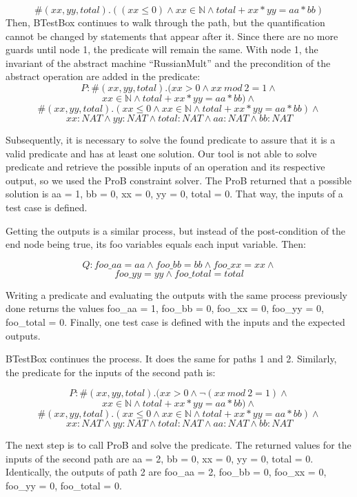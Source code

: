 \documentclass[runningheads]{llncs}
\begin{document}
$$\#(xx, yy, total).((xx \leq 0) \wedge xx \in \mathbb{N} \wedge total + xx * yy = aa * bb)$$
\nolinebreak[4]  Then, BTestBox continues to walk through the path, but the quantification cannot be changed by statements that appear after it. Since there are no more guards until node 1, the predicate will remain the same. With node 1, the invariant of the abstract machine ``RussianMult'' and the precondition of the abstract operation are added in the predicate: \nolinebreak[4]
\noindent
$$P: \#(xx, yy, total).(xx > 0 \wedge xx\ mod\ 2 = 1 \wedge$$
$$ xx \in \mathbb{N} \wedge total + xx * yy = aa * bb) \wedge$$
$$\#(xx, yy, total).(xx \leq 0 \wedge xx \in \mathbb{N} \wedge total + xx * yy = aa * bb) \wedge$$
$$xx : NAT \wedge yy : NAT \wedge total : NAT \wedge aa : NAT \wedge bb : NAT$$ \nolinebreak[4]

Subsequently, it is necessary to solve the found predicate to assure that it is a valid predicate and has at least one solution. Our tool is not able to solve predicate and retrieve the possible inputs of an operation and its respective output, so we used the ProB constraint solver. The ProB returned that a possible solution is aa = 1, bb = 0, xx = 0, yy = 0, total = 0. That way, the inputs of a test case is defined.

Getting the outputs is a similar process, but instead of the post-condition of the end node being true, its foo variables equals each input variable. Then:

$$Q : foo\_aa = aa \wedge foo\_bb = bb \wedge foo\_xx = xx \wedge$$
$$foo\_yy = yy \wedge foo\_total = total$$

Writing a predicate and evaluating the outputs with the same process previously done returns the values foo\_aa = 1, foo\_bb = 0, foo\_xx = 0, foo\_yy = 0, foo\_total = 0. Finally, one test case is defined with the inputs and the expected outputs.

BTestBox continues the process. It does the same for paths 1 and 2. Similarly, the predicate for the inputs of the second path is:

$$P: \#(xx, yy, total).(xx > 0 \wedge \neg(xx\ mod\ 2 = 1) \wedge$$
$$ xx \in \mathbb{N} \wedge total + xx * yy = aa * bb) \wedge$$
$$\#(xx, yy, total).(xx \leq 0 \wedge xx \in \mathbb{N} \wedge total + xx * yy = aa * bb) \wedge$$
$$xx : NAT \wedge yy : NAT \wedge total : NAT \wedge aa : NAT \wedge bb : NAT$$

The next step is to call ProB and solve the predicate. The returned values for the inputs of the second path are aa = 2, bb = 0, xx = 0, yy = 0, total = 0. Identically, the outputs of path 2 are foo\_aa = 2, foo\_bb = 0, foo\_xx = 0, foo\_yy = 0, foo\_total = 0.
\end{document}
